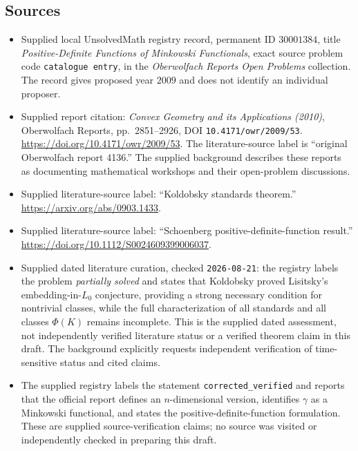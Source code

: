 \documentclass[11pt]{article}
\begin{document}
\subsection{Sources}
\begin{itemize}
\item Supplied local UnsolvedMath registry record, permanent ID \(30001384\), title \emph{Positive-Definite Functions of Minkowski Functionals}, exact source problem code \texttt{catalogue entry}, in the \emph{Oberwolfach Reports Open Problems} collection. The record gives proposed year \(2009\) and does not identify an individual proposer.
\item Supplied report citation: \emph{Convex Geometry and its Applications (2010)}, Oberwolfach Reports, pp.~2851--2926, DOI \texttt{10.4171/owr/2009/53}. \url{https://doi.org/10.4171/owr/2009/53}. The literature-source label is ``original Oberwolfach report 4136.'' The supplied background describes these reports as documenting mathematical workshops and their open-problem discussions.
\item Supplied literature-source label: ``Koldobsky standards theorem.'' \url{https://arxiv.org/abs/0903.1433}.
\item Supplied literature-source label: ``Schoenberg positive-definite-function result.'' \url{https://doi.org/10.1112/S0024609399006037}.
\item Supplied dated literature curation, checked \texttt{2026-08-21}: the registry labels the problem \emph{partially solved} and states that Koldobsky proved Lisitsky's embedding-in-\(L_0\) conjecture, providing a strong necessary condition for nontrivial classes, while the full characterization of all standards and all classes \(\Phi(K)\) remains incomplete. This is the supplied dated assessment, not independently verified literature status or a verified theorem claim in this draft. The background explicitly requests independent verification of time-sensitive status and cited claims.
\item The supplied registry labels the statement \texttt{corrected\_verified} and reports that the official report defines an \(n\)-dimensional version, identifies \(\gamma\) as a Minkowski functional, and states the positive-definite-function formulation. These are supplied source-verification claims; no source was visited or independently checked in preparing this draft.
\end{itemize}
\end{document}
